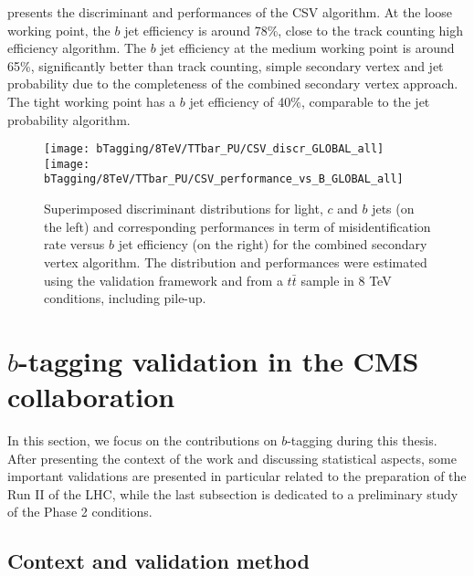      presents the discriminant and
    performances of the CSV algorithm. At the loose working point, the $b$ jet efficiency is
    around 78\%, close to the track counting high efficiency algorithm. The $b$ jet efficiency
    at the medium working point is around 65\%, significantly better than track counting,
    simple secondary vertex and jet probability due to the completeness of the combined
    secondary vertex approach. The tight working point has a $b$ jet efficiency of 40\%,
    comparable to the jet probability algorithm.

    \begin{figure}[th!]
        \centering
        \begin{minipage}{\textwidth}
        \texttt{[image: bTagging/8TeV/TTbar\_PU/CSV\_discr\_GLOBAL\_all]}
        \texttt{[image: bTagging/8TeV/TTbar\_PU/CSV\_performance\_vs\_B\_GLOBAL\_all]}
        \end{minipage}
        \caption{Superimposed discriminant distributions for light, $c$ and $b$ jets (on
        the left) and corresponding performances in term of misidentification rate versus $b$ jet efficiency
        (on the right) for the combined secondary vertex algorithm.
        The distribution and performances were estimated using the validation framework and from
        a $t\bar{t}$ sample in 8 TeV conditions, including pile-up.}
        \label{fig:bTagging/perfCSV}
    \end{figure}

    \section{$b$-tagging validation in the CMS collaboration \label{sec:bTagValidation}}

    In this section, we focus on the contributions on $b$-tagging during this thesis.
    After presenting the context of the work and discussing statistical aspects, some
    important validations are presented in particular related to the preparation of the
    Run II of the LHC, while the last subsection is dedicated to a preliminary study of
    the Phase 2 conditions.

        \subsection{Context and validation method}

